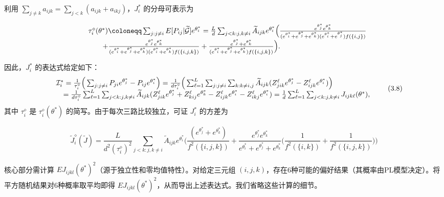 利用 $\sum_{j\neq k}a_{ijk} = \sum_{j< k}(a_{ijk} + a_{ikj})$，$J_{i}^{*}$ 的分母可表示为

$$
\begin{array}{r l} & {\tau_{i}^{\diamond}(\theta^{*})\coloneqq \sum_{j:j\neq i}E[P_{i j}|\widetilde{\mathcal{G}} ]e^{\theta_{i}^{*}} = \frac{L}{d}\sum_{j< k:j,k\neq i}\widetilde{A}_{i j k}e^{\theta_{i}^{*}}\Big(\frac{e^{\theta_{j}^{*}}e^{\theta_{k}^{*}}}{(e^{\theta_{i}^{*}} + e^{\theta_{j}^{*}} + e^{\theta_{k}^{*}})(e^{\theta_{i}^{*}} + e^{\theta_{j}^{*}})f(\{i,j\})}}\\ & {\qquad +\frac{e^{\theta_{j}^{*}}e^{\theta_{k}^{*}}}{(e^{\theta_{i}^{*}} + e^{\theta_{j}^{*}} + e^{\theta_{k}^{*}})(e^{\theta_{i}^{*}} + e^{\theta_{k}^{*}})f(\{i,j,k\})} +\frac{e^{\theta_{j}^{*}} + e^{\theta_{k}^{*}}}{(e^{\theta_{i}^{*}} + e^{\theta_{j}^{*}} + e^{\theta_{k}^{*}})f(\{i,j,k\})}\Big).} \end{array}
$$

因此，$J_{i}^{*}$ 的表达式给定如下： 
\[
\begin{array}{r l} & {\mathcal{I}_{i}^{*} = \frac{1}{\tau_{i}^{\diamond}}\Big(\sum_{j:j\neq i}P_{j i}e^{\theta_{j}^{*}} - P_{i j}e^{\theta_{i}^{*}}\Big) = \frac{1}{d\tau_{i}^{\diamond}}\Big(\sum_{\ell = 1}^{L}\sum_{j:j\neq i}\sum_{k:k\neq i,j}\widetilde{A}_{i j k}(Z_{j i k}^{\ell}e^{\theta_{j}^{*}} - Z_{i j k}^{\ell}e^{\theta_{i}^{*}})\Big)}\\ & {\quad = \frac{1}{d\tau_{i}^{\diamond}}\sum_{\ell = 1}^{L}\sum_{j< k:j,k\neq i}\widetilde{A}_{i j k}(Z_{j i k}^{\ell}e^{\theta_{j}^{*}} + Z_{k i j}^{\ell}e^{\theta_{k}^{*}} - Z_{i j k}^{\ell}e^{\theta_{i}^{*}} - Z_{i k j}^{\ell}e^{\theta_{i}^{*}}) = \frac{1}{d}\sum_{\ell = 1}^{L}\sum_{j< k:j,k\neq i}J_{i j k\ell}(\theta^{*}),} \end{array} \tag{3.8}
\]
其中 $\tau_{i}^{\diamond}$ 是 $\tau_{i}^{\diamond}(\theta^{*})$ 的简写。由于每次三路比较独立，可证 $J_{i}^{*}$ 的方差为

$$
\widetilde{J}_{i}^{\diamond}(\widetilde{J}) = \frac{L}{d^{2}(\tau_{i}^{\diamond})^{2}}\sum_{j< k:j,k\neq i}\widetilde{A}_{ijk}e^{\theta_{i}^{*}}\Big(\frac{(e^{\theta_{j}^{*}} + e^{\theta_{k}^{*}})}{f^{2}(\{i,j,k\})} +\frac{e^{\theta_{j}^{*}}e^{\theta_{k}^{*}}}{e^{\theta_{i}^{*}} + e^{\theta_{j}^{*}} + e^{\theta_{k}^{*}}}\Big(\frac{1}{f^{2}(\{i,k\})} +\frac{1}{f^{2}(\{i,j,k\})}\Big)\Big)
$$

核心部分需计算 $EJ_{ijkl}(\theta^{*})^{2}$（源于独立性和零均值特性）。对给定三元组 $(i,j,k)$，存在6种可能的偏好结果（其概率由PL模型决定）。将平方随机结果对6种概率取平均即得 $EJ_{ijkl}(\theta^{*})^{2}$，从而导出上述表达式。我们省略这些计算的细节。

